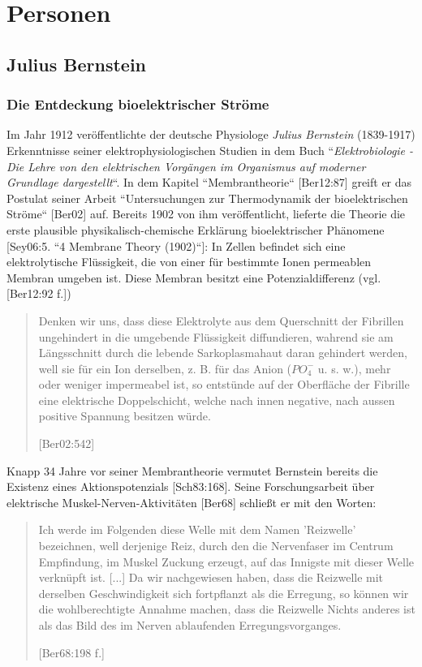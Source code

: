 \chapter{Personen}

\section{Julius Bernstein}\label{appendix:bernstein}

\subsection*{Die Entdeckung bioelektrischer Ströme}

Im Jahr 1912 veröffentlichte der deutsche Physiologe \textit{Julius Bernstein} (1839-1917) Erkenntnisse seiner elektrophysiologischen Studien in dem Buch ``\textit{Elektrobiologie - Die Lehre von den elektrischen Vorgängen im Organismus auf moderner Grundlage dargestellt}``.
In dem Kapitel ``Membrantheorie`` [Ber12:87] greift er das Postulat seiner Arbeit ``Untersuchungen zur Thermodynamik der bioelektrischen Ströme`` [Ber02] auf.
Bereits 1902 von ihm veröffentlicht, lieferte die Theorie die erste plausible physikalisch-chemische Erklärung bioelektrischer Phänomene [Sey06:5. ``4 Membrane Theory (1902)``]:
In Zellen befindet sich eine elektrolytische Flüssigkeit, die von einer für bestimmte Ionen permeablen Membran umgeben ist. Diese Membran besitzt eine Potenzialdifferenz (vgl. {[Ber12:92 f.]})

\blockquote[{[Ber02:542]}]{
    Denken wir uns, dass diese Elektrolyte aus dem Querschnitt der Fibrillen ungehindert in die umgebende Flüssigkeit diffundieren, wahrend sie am Längsschnitt durch die lebende Sarkoplasmahaut daran gehindert werden, well sie für ein Ion derselben, z. B. für das Anion ($PO^-_4$ u. s. w.), mehr oder weniger impermeabel ist, so entstünde auf der Oberfläche der Fibrille eine elektrische Doppelschicht, welche nach innen negative, nach aussen positive Spannung besitzen würde.
}

Knapp 34 Jahre vor seiner Membrantheorie vermutet Bernstein bereits die Existenz eines Aktionspotenzials [Sch83:168]. Seine Forschungsarbeit über elektrische Muskel-Nerven-Aktivitäten {[Ber68]} schließt er mit den Worten:

\blockquote[{[Ber68:198 f.]}]{
    Ich werde im Folgenden diese Welle mit dem Namen 'Reizwelle' bezeichnen, well derjenige Reiz, durch den die Nervenfaser im Centrum Empfindung, im Muskel Zuckung erzeugt, auf das  Innigste mit dieser Welle verknüpft ist. {[...]} Da wir nachgewiesen haben, dass die Reizwelle mit derselben Geschwindigkeit sich fortpflanzt als die Erregung, so können wir die wohlberechtigte Annahme machen, dass die Reizwelle Nichts anderes ist als das Bild des im Nerven ablaufenden Erregungsvorganges.
}

